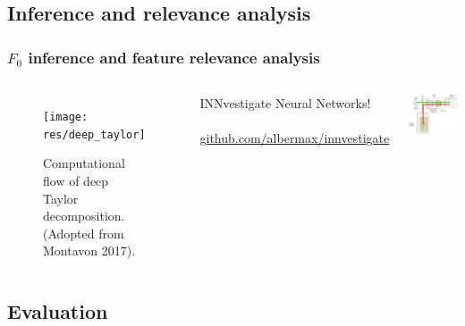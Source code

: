 \documentclass[a4paper,9pt]{beamer}
\theoremstyle{mytheoremstyle}
\begin{document}
\subsection{Inference and relevance analysis}

\begin{frame}
\frametitle{$F_{0}$ inference and feature relevance analysis}
\begin{columns}
\begin{figure}
\begin{center}
  \texttt{[image: res/deep\_taylor]}
\end{center}
	\caption{Computational flow of deep Taylor decomposition. (Adopted from Montavon 2017).}
\end{figure}
\scriptsize{
\begin{exampleblock}{}
{INNvestigate} Neural Networks!\\
\parencite{alber2019}\\
\vspace{1cm}
\url{github.com/albermax/innvestigate}
\vspace{0.2cm}
\end{exampleblock}
}
\includegraphics[width=\textwidth]{res/inference_and_relevance_analysis}
\end{columns}
\end{frame}

\subsection{Evaluation}
\end{document}
